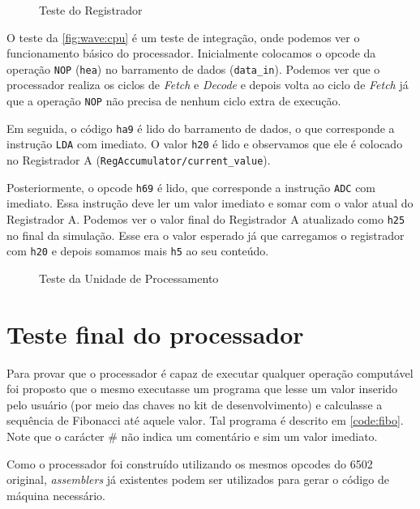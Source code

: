 \documentclass[
	12pt,				  %
	openright,		%
	a4paper,			%
	english,			%
	french,				%
	spanish,			%
	brazil,				%
]{abntex2}
\newcommand{\code}[1]{\colorbox{light-gray}{\texttt{#1}}}
\begin{document}
\begin{figure}[h]
	\centering
	\caption{Teste do Registrador} \label{fig:wave:register}
	
\end{figure}

O teste da \autoref{fig:wave:cpu} é um teste de integração, onde podemos ver o funcionamento
básico do processador.
Inicialmente colocamos o opcode da operação \code{NOP} (\code{hea}) no barramento de dados (\code{data{\_}in}).
Podemos ver que o processador realiza os ciclos de \emph{Fetch} e \emph{Decode} e depois volta ao ciclo de \emph{Fetch}
já que a operação \code{NOP} não precisa de nenhum ciclo extra de execução.

Em seguida, o código \code{ha9} é lido do barramento de dados, o que corresponde a instrução \code{LDA} com imediato.
O valor \code{h20} é lido e observamos que ele é colocado no Registrador A (\code{RegAccumulator/current{\_}value}).

Posteriormente, o opcode \code{h69} é lido, que corresponde a instrução \code{ADC} com imediato. Essa instrução
deve ler um valor imediato e somar com o valor atual do Registrador A.
Podemos ver o valor final do Registrador A atualizado como \code{h25} no final da simulação. Esse era
o valor esperado já que carregamos o registrador com \code{h20} e depois somamos mais \code{h5} ao seu conteúdo.


\begin{figure}[h]
	\centering
	\caption{Teste da Unidade de Processamento} \label{fig:wave:cpu}
	
\end{figure}

\section{Teste final do processador}

Para provar que o processador é capaz de executar qualquer operação computável foi proposto
que o mesmo executasse um programa que lesse um valor inserido pelo usuário (por meio das chaves no kit de
desenvolvimento) e calculasse a sequência de Fibonacci até aquele valor.
Tal programa é descrito em \autoref{code:fibo}. Note que o carácter \# não indica
um comentário e sim um valor imediato.

Como o processador foi construído utilizando os mesmos opcodes do 6502 original,
\emph{assemblers} já existentes podem ser utilizados para gerar o código de máquina
necessário.
\end{document}
